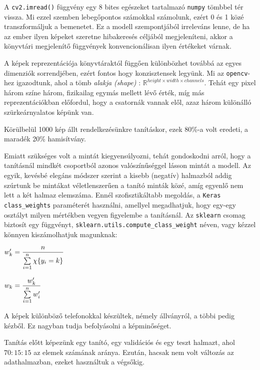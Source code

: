 A \texttt{cv2.imread()} függvény egy 8 bites egészeket
tartalmazó \texttt{numpy} tömbbel tér vissza. Mi ezzel szemben lebegőpontos számokkal számolunk,
ezért 0 és 1 közé transzformáljuk a bemenetet. Ez a modell szempontjából irreleváns lenne,
de ha az ember ilyen képeket szeretne hibakeresés céljából megjeleníteni, akkor a
könyvtári megjelenítő függvények konvencionálisan ilyen értékeket várnak.


A képek reprezentációja könyvtáraktól függően különbözhet továbbá az egyes dimenziók 
sorrendjében, ezért fontos hogy konzisztensek legyünk. Mi az \texttt{opencv}-hez
igazodtunk, ahol a tömb \textit{alakja (shape)} : 
$ \mathbb{R}^{height \times width \times channels } $. 
Tehát egy pixel három színe három, fizikailag egymás mellett lévő érték,
míg más reprezentációkban előfordul, hogy a csatornák vannak elől, azaz három különálló
szürkeárnyalatos képünk van.



Körülbelül 1000 kép állt rendelkezésünkre tanításkor, ezek 80\%-a volt
eredeti, a maradék 20\% hamisítvány. 


Emiatt szükséges volt a mintát kiegyensúlyozni, tehát gondoskodni arról,
hogy a tanításnál mindkét csoportból azonos valószínűséggel lásson mintát 
a modell. Az egyik, kevésbé elegáns módszer szerint a kisebb (negatív) 
halmazból addig szúrtunk be mintákat véletlenszerűen a tanító minták közé, 
amíg egyenlő nem lett a két halmaz elemszáma.
Ennél szofisztikáltabb megoldás, a \texttt{Keras} \texttt{class\_weights} paraméterét
használni, amellyel megadhatjuk, hogy egy-egy osztályt milyen mértékben vegyen 
figyelembe a tanításnál. Az \texttt{sklearn} csomag biztosít egy függvényt,
\texttt{sklearn.utils.compute\_class\_weight} néven, vagy kézzel könnyen kiszámolhatjuk 
magunknak:

$ w_k' =  \dfrac{n}{ \sum\limits_{{i}=1}^{n} \chi\{y_i = k\}}  $

$ w_k =  \dfrac{w_k'}{\sum\limits_{{i}=1}^{n} w_i'} $


A képek különböző telefonokkal készültek, némely állványról, a többi pedig kézből.
Ez nagyban tudja befolyásolni a képminőséget.


Tanítás előtt képezünk egy tanító, egy validációs és egy teszt halmazt, ahol 
$ 70:15:15 $ az elemek számának aránya. Ezután, hacsak nem volt változás az adathalmazban,
ezeket használtuk a végsőkig.



